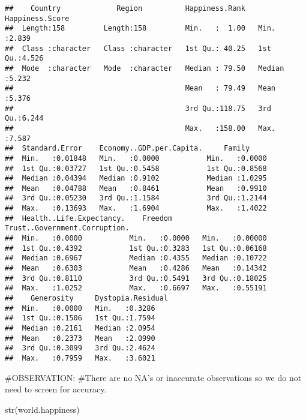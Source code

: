 \documentclass[
]{article}
\newenvironment{Shaded}{\begin{snugshade}}{\end{snugshade}}
\newcommand{\FunctionTok}[1]{\textcolor[rgb]{0.00,0.00,0.00}{#1}}
\newcommand{\NormalTok}[1]{#1}
\begin{document}
\begin{verbatim}
##    Country             Region          Happiness.Rank   Happiness.Score
##  Length:158         Length:158         Min.   :  1.00   Min.   :2.839  
##  Class :character   Class :character   1st Qu.: 40.25   1st Qu.:4.526  
##  Mode  :character   Mode  :character   Median : 79.50   Median :5.232  
##                                        Mean   : 79.49   Mean   :5.376  
##                                        3rd Qu.:118.75   3rd Qu.:6.244  
##                                        Max.   :158.00   Max.   :7.587  
##  Standard.Error    Economy..GDP.per.Capita.     Family      
##  Min.   :0.01848   Min.   :0.0000           Min.   :0.0000  
##  1st Qu.:0.03727   1st Qu.:0.5458           1st Qu.:0.8568  
##  Median :0.04394   Median :0.9102           Median :1.0295  
##  Mean   :0.04788   Mean   :0.8461           Mean   :0.9910  
##  3rd Qu.:0.05230   3rd Qu.:1.1584           3rd Qu.:1.2144  
##  Max.   :0.13693   Max.   :1.6904           Max.   :1.4022  
##  Health..Life.Expectancy.    Freedom       Trust..Government.Corruption.
##  Min.   :0.0000           Min.   :0.0000   Min.   :0.00000              
##  1st Qu.:0.4392           1st Qu.:0.3283   1st Qu.:0.06168              
##  Median :0.6967           Median :0.4355   Median :0.10722              
##  Mean   :0.6303           Mean   :0.4286   Mean   :0.14342              
##  3rd Qu.:0.8110           3rd Qu.:0.5491   3rd Qu.:0.18025              
##  Max.   :1.0252           Max.   :0.6697   Max.   :0.55191              
##    Generosity     Dystopia.Residual
##  Min.   :0.0000   Min.   :0.3286   
##  1st Qu.:0.1506   1st Qu.:1.7594   
##  Median :0.2161   Median :2.0954   
##  Mean   :0.2373   Mean   :2.0990   
##  3rd Qu.:0.3099   3rd Qu.:2.4624   
##  Max.   :0.7959   Max.   :3.6021
\end{verbatim}

\#OBSERVATION: \#There are no NA's or inaccurate observations so we do
not need to screen for accuracy.

\begin{Shaded}
\begin{Highlighting}[]
\FunctionTok{str}\NormalTok{(world.happiness)}
\end{Highlighting}
\end{Shaded}
\end{document}
